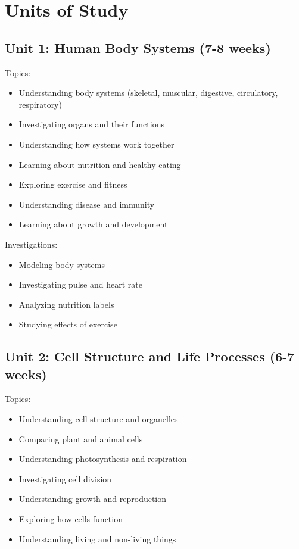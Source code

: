 \documentclass[11pt,letterpaper]{report}
\begin{document}
\section{Units of Study}

\subsection{Unit 1: Human Body Systems (7-8 weeks)}

Topics:
\begin{itemize}
\item Understanding body systems (skeletal, muscular, digestive, circulatory, respiratory)
\item Investigating organs and their functions
\item Understanding how systems work together
\item Learning about nutrition and healthy eating
\item Exploring exercise and fitness
\item Understanding disease and immunity
\item Learning about growth and development
\end{itemize}

Investigations:
\begin{itemize}
\item Modeling body systems
\item Investigating pulse and heart rate
\item Analyzing nutrition labels
\item Studying effects of exercise
\end{itemize}

\subsection{Unit 2: Cell Structure and Life Processes (6-7 weeks)}

Topics:
\begin{itemize}
\item Understanding cell structure and organelles
\item Comparing plant and animal cells
\item Understanding photosynthesis and respiration
\item Investigating cell division
\item Understanding growth and reproduction
\item Exploring how cells function
\item Understanding living and non-living things
\end{itemize}
\end{document}
